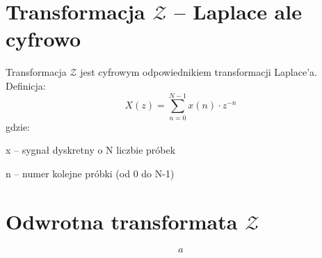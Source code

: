 \section{Transformacja $\mathcal{Z}$ -- Laplace ale cyfrowo}
    \tab Transformacja $\mathcal{Z}$ jest cyfrowym odpowiednikiem transformacji Laplace'a.
    Definicja:
        \begin{equation*}
            X(z) = \sum_{n = 0}^{N-1} x(n)\cdot z^{-n}
        \end{equation*}
        gdzie:
        \begin{description}
            \item x -- sygnał dyskretny o N liczbie próbek
            \item n -- numer kolejne próbki (od 0 do N-1)
        \end{description}
    


\section{Odwrotna transformata $\mathcal{Z}$}
        \begin{equation*}
            a
        \end{equation*}